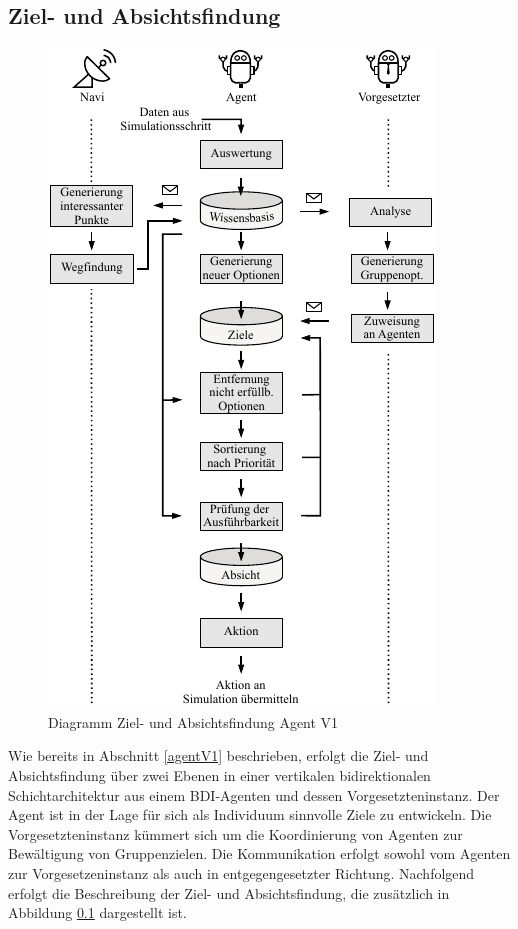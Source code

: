 \documentclass[runningheads]{llncs}
\begin{document}
\subsection{Ziel- und Absichtsfindung}\label{absichtsfindung}
\begin{figure}[t]
\centering
\includegraphics[scale=1]{./Referenzen/Entscheidungsfindung.pdf}
\caption{Diagramm Ziel- und Absichtsfindung Agent V1}
\label{desires}
\end{figure}
Wie bereits in Abschnitt \ref{agentV1} beschrieben, erfolgt die Ziel- und Absichtsfindung über zwei Ebenen in einer vertikalen bidirektionalen Schichtarchitektur aus einem BDI-Agenten und dessen Vorgesetzteninstanz. Der Agent ist in der Lage für sich als Individuum sinnvolle Ziele zu entwickeln. Die Vorgesetzteninstanz kümmert sich um die Koordinierung von Agenten zur Bewältigung von Gruppenzielen. Die Kommunikation erfolgt sowohl vom Agenten zur Vorgesetzeninstanz als auch in entgegengesetzter Richtung. Nachfolgend erfolgt die Beschreibung der Ziel- und Absichtsfindung, die zusätzlich in Abbildung \ref{absichtsfindung} dargestellt ist.
\end{document}
